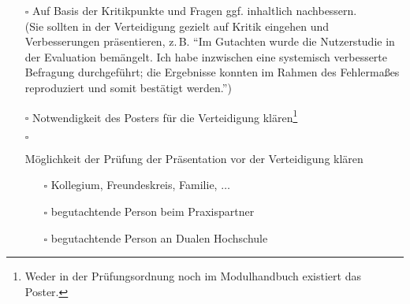 \begin{itemize}
{\begin{itemize}
{\begin{itemize}
                \end{itemize}
            }
            \item[$\square$]{
                Auf Basis der Kritikpunkte und Fragen ggf. inhaltlich nachbessern.\\
                (Sie sollten in der Verteidigung gezielt auf Kritik eingehen und Verbesserungen präsentieren, z.\,B. \enquote{Im Gutachten wurde die Nutzerstudie in der Evaluation bemängelt. Ich habe inzwischen eine systemisch verbesserte Befragung durchgeführt; die Ergebnisse konnten im Rahmen des Fehlermaßes reproduziert und somit bestätigt werden.})
            }         
            \item[$\square$] Notwendigkeit des Posters für die Verteidigung klären\footnote{Weder in der Prüfungsordnung noch im Modulhandbuch existiert das Poster.}
            \item[$\square$]{
                Möglichkeit der Prüfung der Präsentation vor der Verteidigung klären
                \begin{itemize}
                    \item[$\square$] Kollegium, Freundeskreis, Familie, $\ldots$
                    \item[$\square$] begutachtende Person beim Praxispartner
                    \item[$\square$] begutachtende Person an Dualen Hochschule
                \end{itemize}
            }
        \end{itemize}
    }
\end{itemize}